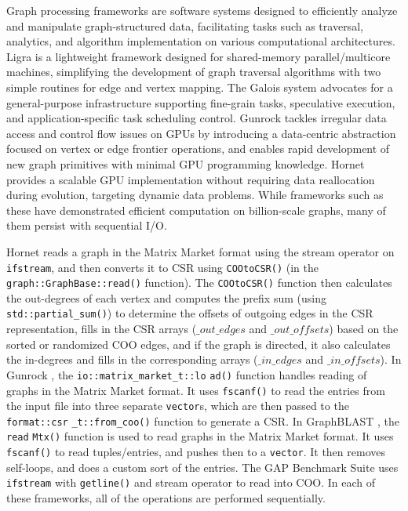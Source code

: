 Graph processing frameworks are software systems designed to efficiently analyze and manipulate graph-structured data, facilitating tasks such as traversal, analytics, and algorithm implementation on various computational architectures. Ligra \cite{shun2013ligra} is a lightweight framework designed for shared-memory parallel/multicore machines, simplifying the development of graph traversal algorithms with two simple routines for edge and vertex mapping. The Galois system \cite{nguyen2013lightweight} advocates for a general-purpose infrastructure supporting fine-grain tasks, speculative execution, and application-specific task scheduling control. Gunrock \cite{wang2016gunrock} tackles irregular data access and control flow issues on GPUs by introducing a data-centric abstraction focused on vertex or edge frontier operations, and enables rapid development of new graph primitives with minimal GPU programming knowledge. Hornet \cite{busato2018hornet} provides a scalable GPU implementation without requiring data reallocation during evolution, targeting dynamic data problems. While frameworks such as these have demonstrated efficient computation on billion-scale graphs, many of them persist with sequential I/O.

Hornet \cite{busato2018hornet} reads a graph in the Matrix Market format using the stream operator on \texttt{ifstream}, and then converts it to CSR using \texttt{COOtoCSR()} (in the \texttt{graph::GraphBase::read()} function). The \texttt{COOtoCSR()} function then calculates the out-degrees of each vertex and computes the prefix sum (using \texttt{std::partial\_sum()}) to determine the offsets of outgoing edges in the CSR representation, fills in the CSR arrays ($\_out\_edges$ and $\_out\_offsets$) based on the sorted or randomized COO edges, and if the graph is directed, it also calculates the in-degrees and fills in the corresponding arrays ($\_in\_edges$ and $\_in\_offsets$). In Gunrock \cite{wang2016gunrock}, the \texttt{io::matrix\_market\_t::lo} \texttt{ad()} function handles reading of graphs in the Matrix Market format. It uses \texttt{fscanf()} to read the entries from the input file into three separate \texttt{vector}s, which are then passed to the \texttt{format::csr} \texttt{\_t::from\_coo()} function to generate a CSR. In GraphBLAST \cite{yang2022graphblast}, the \texttt{read} \texttt{Mtx()} function is used to read graphs in the Matrix Market format. It uses \texttt{fscanf()} to read tuples/entries, and pushes then to a \texttt{vector}. It then removes self-loops, and does a custom sort of the entries. The GAP Benchmark Suite \cite{beamer2015gap} uses \texttt{ifstream} with \texttt{getline()} and stream operator to read into COO. In each of these frameworks, all of the operations are performed sequentially.

